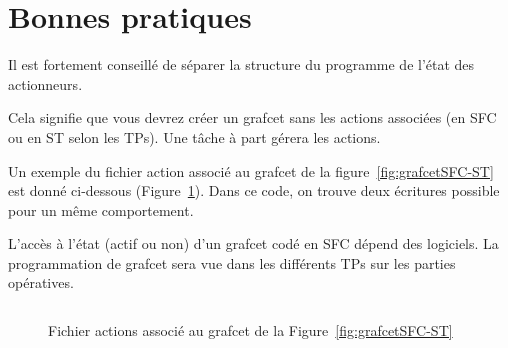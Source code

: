 \section{Bonnes pratiques}
  Il est fortement conseillé de séparer la structure du programme de l'état des actionneurs.

  Cela signifie que vous devrez créer un grafcet sans les actions associées (en SFC ou en ST selon les TPs). Une tâche à part gérera les actions.

Un exemple du fichier action associé au grafcet de la figure~\ref{fig:grafcetSFC-ST} est donné ci-dessous (Figure~\ref{fig:actions}). Dans ce code, on trouve deux écritures possible pour un même comportement.

L'accès à l'état (actif ou non) d'un grafcet codé en SFC dépend des logiciels. La programmation de grafcet sera vue dans les différents TPs sur les parties opératives.

\begin{figure}[ht]
  \inputminted{C}{texteStructure/actions.c}
  \caption{Fichier actions associé au grafcet de la Figure~\ref{fig:grafcetSFC-ST}}
  \label{fig:actions}
\end{figure}
